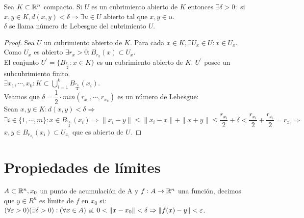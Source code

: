 \begin{prop}
  Sea $K \subset \mathbb{R}^n$ compacto. Si $U$ es un cubrimiento abierto de $K$ entonces $\exists \delta > 0 :$ si $x, y \in K, d(x, y) < \delta \Rightarrow \exists u \in U$ abierto tal que $x, y \in u$. \\
  $\delta$ se llama número de Lebesgue del cubrimiento $U$.
  \begin{proof}
    Sea $U$ un cubrimiento abierto de $K$. Para cada $x \in K, \exists U_x \in U : x \in U_x$. Como $U_x$ es abierto $\exists r_x > 0 : B_{r_k}(x) \subset U_x$. \\
    El conjunto $U^{\prime} = \{ B_{\frac{r_x}{2}} : x \in K \}$ es un cubrimiento abierto de $K$. $U^{\prime}$ posee un subcubrimiento finito. \\
    $\exists x_1, \cdots, x_k : K \subset \bigcup_{i = 1}^{k} B_{\frac{r_{x_i}}{2}}(x_i)$. \\
    Veamos que $\delta = \dfrac{1}{2} \cdot min(r_{x_1}, \cdots, r_{x_k})$ es un número de Lebesgue: \\
    Sean $x, y \in K : d(x,y) < \delta \Rightarrow$ \\
    $\exists i \in \{1, \cdots, m\} : x \in B_{\frac{r_{x_i}}{2}}(x_i) \Rightarrow \|x_i - y\| \leq \|x_i - x\| + \|x+y\| \leq \dfrac{r_{x_i}}{2} + \delta < \dfrac{r_{x_i}}{2} + \dfrac{r_{x_i}}{2} = r_{x_i} \Rightarrow$ \\
    $x, y \in B_{r_{x_i}}(x_i) \subset U_{x_i}$ que es abierto de $U$.
  \end{proof}
\end{prop}

\section{Propiedades de límites}

\begin{definition}[Límite]
  $A \subset \mathbb{R}^n, x_0$ un punto de acumulación de A y $f: A \to \mathbb{R}^n$ una función, decimos que $y \in R^n$ es límite de $f$ en $x_0$ si: \\
  $(\forall \varepsilon > 0)(\exists \delta>0) : (\forall x \in A)$ si $0 < \|x - x_0\| < \delta \Rightarrow \|f(x) - y\| < \varepsilon$.
\end{definition}

